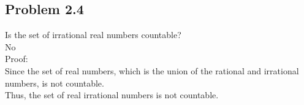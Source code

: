 \subsection*{Problem 2.4}
Is the set of irrational real numbers countable? \\ 
No\\ 
Proof:\\ 
Since the set of real numbers, which is the union of the rational and irrational numbers, is not countable. \\ 
Thus, the set of real irrational numbers is not countable. 
\begin{figure}[ht]\end{figure} 
\\
\newpage 

